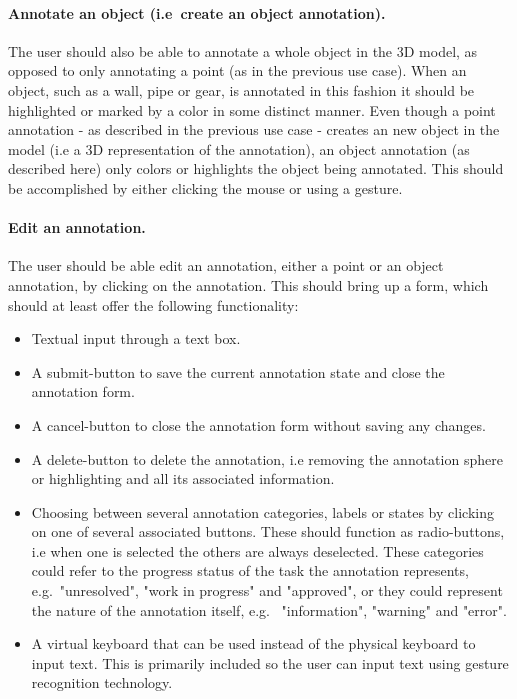 \paragraph{Annotate an object (i.e~create an object annotation).} The user should also be able to annotate a whole object in the 3D model, as opposed to only annotating a point (as in the previous use case). 
When an object, such as a wall, pipe or gear, is annotated in this fashion it should be highlighted or marked by a color in some distinct manner. 
Even though a point annotation - as described in the previous use case - creates an new object in the model (i.e a 3D representation of the annotation), 
an object annotation (as described here) only colors or highlights the object being annotated. 
This should be accomplished by either clicking the mouse or using a gesture. 

\paragraph{Edit an annotation.} The user should be able edit an annotation, either a point or an object annotation, by clicking on the annotation. 
This should bring up a form, which should at least offer the following functionality:
\begin{itemize}
	\item Textual input through a text box.
	\item A submit-button to save the current annotation state and close the annotation form.
	\item A cancel-button to close the annotation form without saving any changes.
	\item A delete-button to delete the annotation, i.e removing the annotation sphere or highlighting and all its associated information. 
	\item Choosing between several annotation categories, labels or states by clicking on one of several associated buttons. 
			These should function as radio-buttons, i.e when one is selected the others are always deselected.
			These categories could refer to the progress status of the task the annotation represents, e.g.~"unresolved", "work in progress" and "approved",
			or they could represent the nature of the annotation itself, e.g.~ "information", "warning" and "error".

	\item A virtual keyboard that can be used instead of the physical keyboard to input text. This is primarily included so the user can input text using 
			gesture recognition technology.
\end{itemize}

